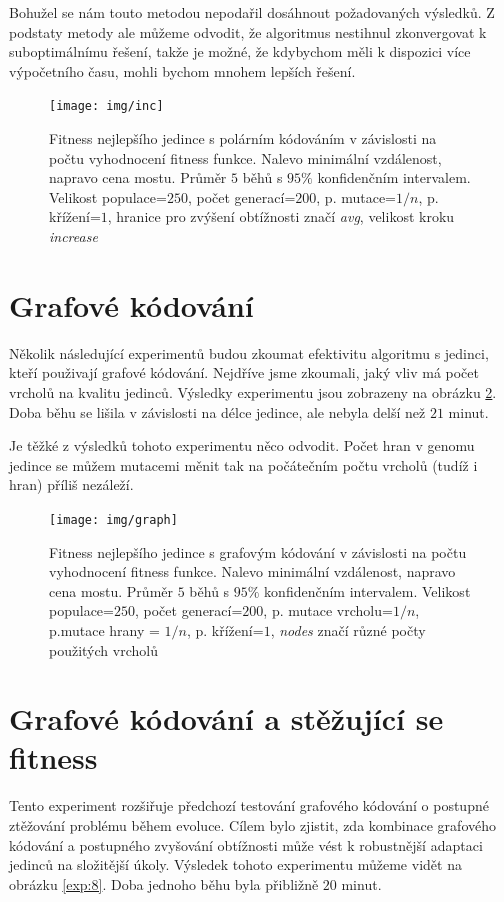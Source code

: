 Bohužel se nám touto metodou nepodařil dosáhnout požadovaných výsledků. Z podstaty metody ale můžeme odvodit, že algoritmus nestihnul zkonvergovat k suboptimálnímu řešení, takže je možné, že kdybychom měli k dispozici více výpočetního času, mohli bychom mnohem lepších řešení.

\begin{figure}[p]\centering
\texttt{[image: img/inc]}
\caption{Fitness nejlepšího jedince s polárním kódováním v závislosti na počtu vyhodnocení fitness funkce. Nalevo minimální vzdálenost, napravo cena mostu. Průměr $5$ běhů s $95\%$ konfidenčním intervalem. Velikost populace=$250$, počet generací=$200$, p. mutace=$1/n$, p. křížení=$1$, hranice pro zvýšení obtížnosti značí \emph{avg}, velikost kroku \emph{increase}}
\label{exp:6}
\end{figure}

\section{Grafové kódování}

Několik následující experimentů budou zkoumat efektivitu algoritmu s jedinci, kteří použivají grafové kódování. Nejdříve jsme zkoumali, jaký vliv má počet vrcholů na kvalitu jedinců. Výsledky experimentu jsou zobrazeny na obrázku \ref{exp:7}. Doba běhu se lišila v závislosti na délce jedince, ale nebyla delší než $21$ minut.

Je těžké z výsledků tohoto experimentu něco odvodit. Počet hran v genomu jedince se můžem mutacemi měnit tak na počátečním počtu vrcholů (tudíž i hran) příliš nezáleží.

\begin{figure}[p]\centering
\texttt{[image: img/graph]}
\caption{Fitness nejlepšího jedince s grafovým kódování v závislosti na počtu vyhodnocení fitness funkce. Nalevo minimální vzdálenost, napravo cena mostu. Průměr $5$ běhů s $95\%$ konfidenčním intervalem. Velikost populace=$250$, počet generací=$200$, p. mutace vrcholu=$1/n$, p.mutace hrany = $1/n$, p. křížení=$1$, \emph{nodes} značí různé počty použitých vrcholů}
\label{exp:7}
\end{figure}


\section{Grafové kódování a stěžující se fitness}

Tento experiment rozšiřuje předchozí testování grafového kódování o postupné ztěžování problému během evoluce. Cílem bylo zjistit, zda kombinace grafového kódování a postupného zvyšování obtížnosti může vést k robustnější adaptaci jedinců na složitější úkoly. Výsledek tohoto experimentu můžeme vidět na obrázku \ref{exp:8}. Doba jednoho běhu byla přibližně $20$ minut.

